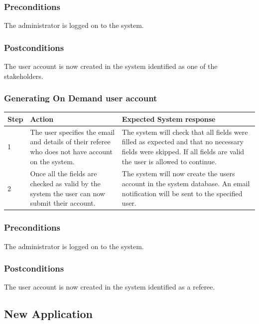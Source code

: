 \documentclass[12pt]{article}
\begin{document}
\subsubsection*{Preconditions}
The administrator is logged on to the system.

\subsubsection*{Postconditions}
The user account is now created in the system identified as one of the stakeholders.

\subsubsection{Generating On Demand user account}

\begin{center}
\begin{tabular}{|l|p{6cm}|p{8cm}|}
\hline
Step & Action & Expected System response \\
\hline
1 & The user specifies the email and details of their referee who does not have account on the system. & The system will check that all fields were filled as expected and that no necessary fields were skipped. If all fields are valid the user is allowed to continue. \\
\hline
2 & Once all the fields are checked as valid by the system the user can now submit their account. & The system will now create the users account in the system database. An email notification will be sent to the specified user. \\
\hline
\end{tabular}
\end{center}

\subsubsection*{Preconditions}
The administrator is logged on to the system.

\subsubsection*{Postconditions}
The user account is now created in the system identified as a referee.
\subsection{New Application}
\end{document}
